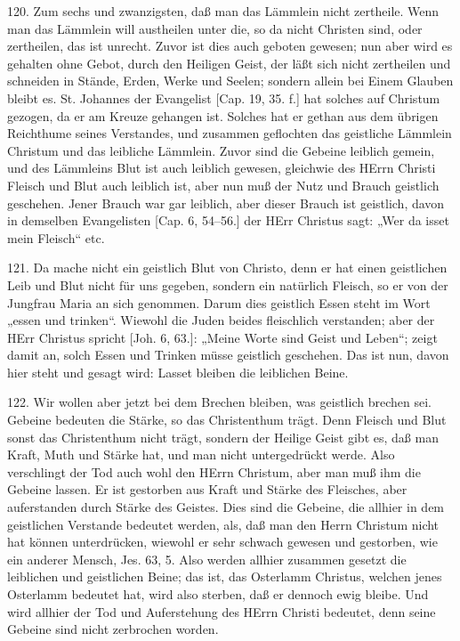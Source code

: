 120. Zum sechs und zwanzigsten, daß man das Lämmlein nicht zertheile. Wenn man das Lämmlein will austheilen unter die, so da nicht Christen sind, oder zertheilen, das ist unrecht. Zuvor ist dies auch geboten gewesen; nun aber wird es gehalten ohne Gebot, durch den Heiligen
Geist, der läßt sich nicht zertheilen und schneiden in Stände, Erden, Werke und Seelen; sondern allein bei Einem Glauben bleibt es. St. Johannes der Evangelist [Cap. 19, 35. f.] hat solches auf Christum gezogen, da er am Kreuze gehangen ist. Solches hat er gethan aus dem übrigen Reichthume seines Verstandes, und zusammen geflochten das geistliche Lämmlein Christum und das leibliche Lämmlein. Zuvor sind die Gebeine leiblich gemein, und des Lämmleins Blut ist auch leiblich gewesen, gleichwie des HErrn Christi Fleisch und Blut auch leiblich ist, aber nun muß der Nutz und Brauch geistlich geschehen. Jener Brauch war gar leiblich, aber dieser Brauch ist geistlich, davon in demselben Evangelisten [Cap. 6, 54–56.] der HErr Christus sagt: „Wer da isset mein Fleisch“ etc.

121. Da mache nicht ein geistlich Blut von Christo, denn er hat einen geistlichen Leib und Blut nicht für uns gegeben, sondern ein natürlich Fleisch, so er von der Jungfrau Maria an sich genommen. Darum dies geistlich Essen steht im Wort „essen und trinken“. Wiewohl die Juden beides fleischlich verstanden; aber der HErr Christus spricht [Joh. 6, 63.]: „Meine Worte sind Geist und Leben“; zeigt damit an, solch Essen und Trinken müsse geistlich geschehen. Das ist nun, davon hier steht und gesagt wird: Lasset bleiben die leiblichen Beine.

122. Wir wollen aber jetzt bei dem Brechen bleiben, was geistlich brechen sei. Gebeine bedeuten die Stärke, so das Christenthum trägt. Denn Fleisch und Blut sonst das Christenthum nicht trägt, sondern der Heilige Geist gibt es, daß man Kraft, Muth und Stärke hat, und man nicht untergedrückt werde. Also verschlingt der Tod auch wohl den HErrn Christum, aber man muß ihm die Gebeine lassen. Er ist gestorben aus Kraft und Stärke des Fleisches, aber auferstanden durch Stärke des Geistes. Dies sind die Gebeine, die allhier in dem geistlichen Verstande bedeutet werden, als, daß man den Herrn Christum nicht hat können unterdrücken, wiewohl er sehr schwach gewesen und gestorben, wie ein anderer Mensch, Jes. 63, 5. Also werden allhier zusammen gesetzt die leiblichen und geistlichen Beine; das ist, das Osterlamm Christus, welchen jenes Osterlamm bedeutet hat, wird also sterben, daß er dennoch ewig bleibe. Und wird allhier der Tod und Auferstehung des HErrn Christi bedeutet, denn seine Gebeine sind nicht zerbrochen worden.

